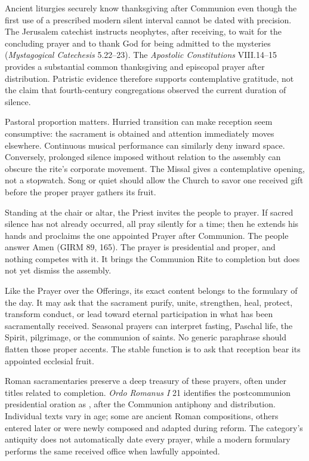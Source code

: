 Ancient liturgies securely know thanksgiving after Communion even though the first use of a prescribed modern silent interval cannot be dated with precision. The Jerusalem catechist instructs neophytes, after receiving, to wait for the concluding prayer and to thank God for being admitted to the mysteries (\emph{Mystagogical Catechesis} 5.22--23). The \emph{Apostolic Constitutions} VIII.14--15 provides a substantial common thanksgiving and episcopal prayer after distribution. Patristic evidence therefore supports contemplative gratitude, not the claim that fourth-century congregations observed the current duration of silence.

Pastoral proportion matters. Hurried transition can make reception seem consumptive: the sacrament is obtained and attention immediately moves elsewhere. Continuous musical performance can similarly deny inward space. Conversely, prolonged silence imposed without relation to the assembly can obscure the rite's corporate movement. The Missal gives a contemplative opening, not a stopwatch. Song or quiet should allow the Church to savor one received gift before the proper prayer gathers its fruit.


Standing at the chair or altar, the Priest invites the people to prayer. If sacred silence has not already occurred, all pray silently for a time; then he extends his hands and proclaims the one appointed Prayer after Communion. The people answer Amen (GIRM 89, 165). The prayer is presidential and proper, and nothing competes with it. It brings the Communion Rite to completion but does not yet dismiss the assembly.

Like the Prayer over the Offerings, its exact content belongs to the formulary of the day. It may ask that the sacrament purify, unite, strengthen, heal, protect, transform conduct, or lead toward eternal participation in what has been sacramentally received. Seasonal prayers can interpret fasting, Paschal life, the Spirit, pilgrimage, or the communion of saints. No generic paraphrase should flatten those proper accents. The stable function is to ask that reception bear its appointed ecclesial fruit.

Roman sacramentaries preserve a deep treasury of these prayers, often under titles related to completion. \emph{Ordo Romanus I} 21 identifies the postcommunion presidential oration as , after the Communion antiphony and distribution. Individual texts vary in age; some are ancient Roman compositions, others entered later or were newly composed and adapted during reform. The category's antiquity does not automatically date every prayer, while a modern formulary performs the same received office when lawfully appointed.

